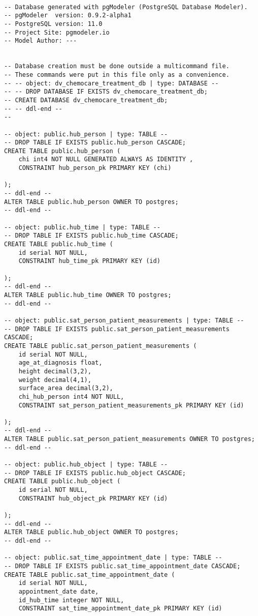 \begin{lstlisting}

-- Database generated with pgModeler (PostgreSQL Database Modeler).
-- pgModeler  version: 0.9.2-alpha1
-- PostgreSQL version: 11.0
-- Project Site: pgmodeler.io
-- Model Author: ---


-- Database creation must be done outside a multicommand file.
-- These commands were put in this file only as a convenience.
-- -- object: dv_chemocare_treatment_db | type: DATABASE --
-- -- DROP DATABASE IF EXISTS dv_chemocare_treatment_db;
-- CREATE DATABASE dv_chemocare_treatment_db;
-- -- ddl-end --
-- 

-- object: public.hub_person | type: TABLE --
-- DROP TABLE IF EXISTS public.hub_person CASCADE;
CREATE TABLE public.hub_person (
	chi int4 NOT NULL GENERATED ALWAYS AS IDENTITY ,
	CONSTRAINT hub_person_pk PRIMARY KEY (chi)

);
-- ddl-end --
ALTER TABLE public.hub_person OWNER TO postgres;
-- ddl-end --

-- object: public.hub_time | type: TABLE --
-- DROP TABLE IF EXISTS public.hub_time CASCADE;
CREATE TABLE public.hub_time (
	id serial NOT NULL,
	CONSTRAINT hub_time_pk PRIMARY KEY (id)

);
-- ddl-end --
ALTER TABLE public.hub_time OWNER TO postgres;
-- ddl-end --

-- object: public.sat_person_patient_measurements | type: TABLE --
-- DROP TABLE IF EXISTS public.sat_person_patient_measurements CASCADE;
CREATE TABLE public.sat_person_patient_measurements (
	id serial NOT NULL,
	age_at_diagnosis float,
	height decimal(3,2),
	weight decimal(4,1),
	surface_area decimal(3,2),
	chi_hub_person int4 NOT NULL,
	CONSTRAINT sat_person_patient_measurements_pk PRIMARY KEY (id)

);
-- ddl-end --
ALTER TABLE public.sat_person_patient_measurements OWNER TO postgres;
-- ddl-end --

-- object: public.hub_object | type: TABLE --
-- DROP TABLE IF EXISTS public.hub_object CASCADE;
CREATE TABLE public.hub_object (
	id serial NOT NULL,
	CONSTRAINT hub_object_pk PRIMARY KEY (id)

);
-- ddl-end --
ALTER TABLE public.hub_object OWNER TO postgres;
-- ddl-end --

-- object: public.sat_time_appointment_date | type: TABLE --
-- DROP TABLE IF EXISTS public.sat_time_appointment_date CASCADE;
CREATE TABLE public.sat_time_appointment_date (
	id serial NOT NULL,
	appointment_date date,
	id_hub_time integer NOT NULL,
	CONSTRAINT sat_time_appointment_date_pk PRIMARY KEY (id)


\end{lstlisting}
